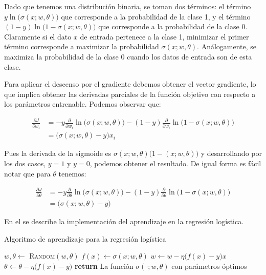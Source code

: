 Dado que tenemos una distribución binaria, se toman dos términos: el término $y \ln\big( \sigma(x; w, \theta)\big)$ que corresponde a la probabilidad de la clase 1, y el término $(1-y) \ln\big( 1-\sigma(x; w, \theta)\big)$ que corresponde a la probabilidad de la clase 0. Claramente si el dato $x$ de entrada pertenece a la clase 1, minimizar el primer término corresponde a maximizar la probabilidad $\sigma(x; w, \theta)$. Análogamente, se maximiza la probabilidad de la clase 0 cuando los datos de entrada son de esta clase.

Para aplicar el descenso por el gradiente debemos obtener el vector gradiente, lo que implica obtener las derivadas parciales de la función objetivo con respecto a los parámetros entrenable. Podemos observar que:

\begin{align*}
    \frac{\partial J }{\partial w_i} &= - y \frac{\partial}{\partial w_i} \ln\big( \sigma(x; w, \theta)\big) - (1- y) \frac{\partial }{\partial w_i}  \ln\big( 1-\sigma(x; w, \theta) \big) \\
        &= \big( \sigma(x; w, \theta) - y \big) x_i 
\end{align*}

Pues la derivada de la sigmoide es $\sigma(x; w, \theta)\big(1-(x; w, \theta)\big)$ y desarrollando por los dos casos, $y=1$ y $y=0$, podemos obtener el resultado. De igual forma es fácil notar que para $\theta$ tenemos:

\begin{align*}
    \frac{\partial J }{\partial \theta} &= - y \frac{\partial}{\partial \theta} \ln\big( \sigma(x; w, \theta)\big) - (1- y) \frac{\partial }{\partial \theta}  \ln\big( 1-\sigma(x; w, \theta) \big) \\
        &= \big( \sigma(x; w, \theta) - y \big)
\end{align*}

En el  se describe la implementación del aprendizaje en la regresión logística.


\begin{algorithm}
 \caption{Algoritmo de aprendizaje para la regresión logística}\label{alg:AlgReg}
 \begin{algorithmic}
    \State $w, \theta \leftarrow$ \textsc{Random}$(w, \theta)$
            \State $f(x) \leftarrow \sigma(x; w, \theta) $
            \State $w \leftarrow w - \eta \big( f(x) - y \big) x $
            \State $\theta \leftarrow \theta - \eta \big( f(x) - y \big) $
        \EndFor
    \EndFor
    \State \textbf{return} La función $\sigma(\cdot; w, \theta)$ con parámetros óptimos
  \EndFunction
 \end{algorithmic}
\end{algorithm}

